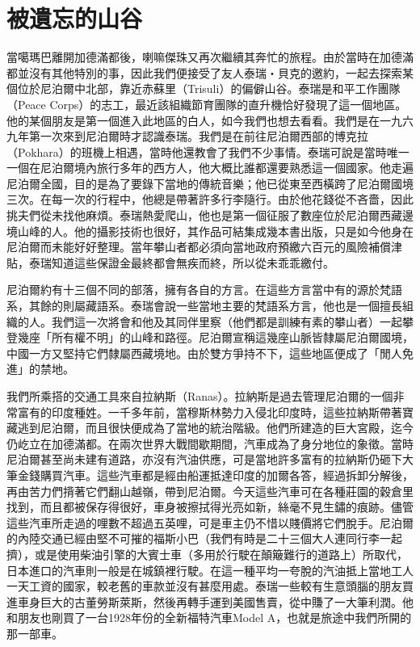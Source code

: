 \chapter{被遺忘的山谷}

當噶瑪巴離開加德滿都後，喇嘛傑珠又再次繼續其奔忙的旅程。由於當時在加德滿都並沒有其他特別的事，因此我們便接受了友人泰瑞‧貝克的邀約，一起去探索某個位於尼泊爾中北部，靠近赤蘇里（Trisuli）的偏僻山谷。泰瑞是和平工作團隊（Peace
Corps）的志工，最近該組織節育團隊的直升機恰好發現了這一個地區。他的某個朋友是第一個進入此地區的白人，如今我們也想去看看。我們是在一九六九年第一次來到尼泊爾時才認識泰瑞。我們是在前往尼泊爾西部的博克拉（Pokhara）的班機上相遇，當時他還教會了我們不少事情。泰瑞可說是當時唯一一個在尼泊爾境內旅行多年的西方人，他大概比誰都還要熟悉這一個國家。他走遍尼泊爾全國，目的是為了要錄下當地的傳統音樂；他已從東至西橫跨了尼泊爾國境三次。在每一次的行程中，他總是帶著許多行李隨行。由於他花錢從不吝嗇，因此挑夫們從未找他麻煩。泰瑞熱愛爬山，他也是第一個征服了數座位於尼泊爾西藏邊境山峰的人。他的攝影技術也很好，其作品可結集成幾本書出版，只是如今他身在尼泊爾而未能好好整理。當年攀山者都必須向當地政府預繳六百元的風險補償津貼，泰瑞知道這些保證金最終都會無疾而終，所以從未乖乖繳付。

尼泊爾約有十三個不同的部落，擁有各自的方言。在這些方言當中有的源於梵語系，其餘的則屬藏語系。泰瑞會說一些當地主要的梵語系方言，他也是一個擅長組織的人。我們這一次將會和他及其同伴里察（他們都是訓練有素的攀山者）一起攀登幾座「所有權不明」的山峰和路徑。尼泊爾宣稱這幾座山脈皆隸屬尼泊爾國境，中國一方又堅持它們隸屬西藏境地。由於雙方爭持不下，這些地區便成了「閒人免進」的禁地。

我們所乘搭的交通工具來自拉納斯（Ranas）。拉納斯是過去管理尼泊爾的一個非常富有的印度種姓。一千多年前，當穆斯林勢力入侵北印度時，這些拉納斯帶著寶藏逃到尼泊爾，而且很快便成為了當地的統治階級。他們所建造的巨大宮殿，迄今仍屹立在加德滿都。在兩次世界大戰間歇期間，汽車成為了身分地位的象徵。當時尼泊爾甚至尚未建有道路，亦沒有汽油供應，可是當地許多富有的拉納斯仍砸下大筆金錢購買汽車。這些汽車都是經由船運抵達印度的加爾各答，經過拆卸分解後，再由苦力們揹著它們翻山越嶺，帶到尼泊爾。今天這些汽車可在各種莊園的穀倉里找到，而且都被保存得很好，車身被擦拭得光亮如新，絲毫不見生鏽的痕跡。儘管這些汽車所走過的哩數不超過五英哩，可是車主仍不惜以賤價將它們脫手。尼泊爾的內陸交通已經由堅不可摧的福斯小巴（我們有時是二十三個大人連同行李一起擠），或是使用柴油引擎的大賓士車（多用於行駛在顛簸難行的道路上）所取代，日本進口的汽車則一般是在城鎮裡行駛。在這一種平均一夸脫的汽油抵上當地工人一天工資的國家，較老舊的車款並沒有甚麼用處。泰瑞一些較有生意頭腦的朋友買進車身巨大的古董勞斯萊斯，然後再轉手運到美國售賣，從中賺了一大筆利潤。他和朋友也剛買了一台1928年份的全新福特汽車Model
A，也就是旅途中我們所開的那一部車。

